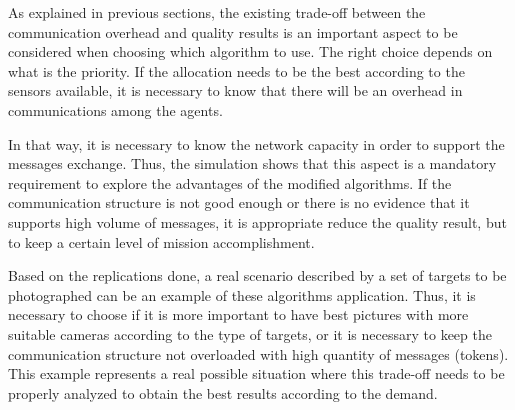 As explained in previous sections, the existing trade-off between the communication overhead and quality results is an important aspect to be considered when choosing which algorithm to use. The right choice depends on what is the priority. If the allocation needs to be the best according to the sensors available, it is necessary to know that there will be an overhead in communications among the agents. 

In that way, it is necessary to know the network capacity in order to support the messages exchange. Thus, the simulation shows that this aspect is a mandatory requirement to explore the advantages of the modified algorithms. If the communication structure is not good enough or there is no evidence that it supports high volume of messages, it is appropriate reduce the quality result, but to keep a certain level of mission accomplishment.

Based on the replications done, a real scenario described by a set of targets to be photographed can be an example of these algorithms application. Thus, it is necessary to choose if it is more important to have best pictures with more suitable cameras according to the type of targets, or it is necessary to keep the communication structure not overloaded with high quantity of messages (tokens). This example represents a real possible situation where this trade-off needs to be properly analyzed to obtain the best results according to the demand.
